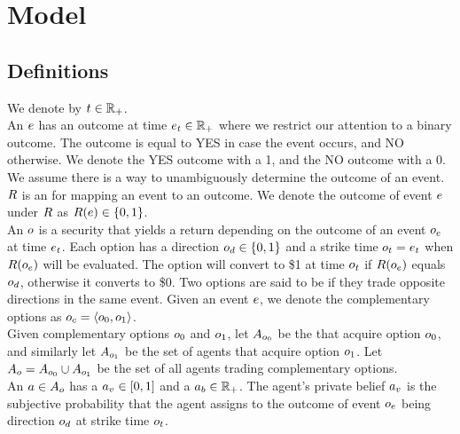 \section{Model}

\subsection{Definitions}

We denote  by $t\in\mathbb{R}_+$. \\

An  $e$ has an outcome at time $e_t \in \mathbb{R}_+$ 
where we restrict our attention to a binary outcome. 
The outcome is equal to YES in case the event occurs, and NO otherwise. 
We denote the YES outcome with a 1, and the NO outcome with a 0.
We assume there is a way to unambiguously determine the outcome of an event. \\

$R$ is an  for mapping an event to an outcome.
We denote the outcome of event $e$ under $R$ as 
$R(e) \in \{0,1\}$.\\

An  $o$ is a security that yields a return depending on 
the outcome of an event $o_e$ at time $e_t$. Each option has a direction 
$o_d \in \{0, 1\}$ and a strike time $o_t = e_t$ 
when $R(o_e)$ will be evaluated. 
The option will convert to \$1 at time $o_t$ if $R(o_e)$ equals 
$o_d$, otherwise it converts to \$0. Two options are said to be
 if they trade opposite directions in the same event. Given an
event $e$, we denote the complementary options as 
$o_c = \left<o_{0}, o_{1}\right>$.\\

Given complementary options $o_{0}$ and $o_{1}$,
let $A_{o_0}$ be the  that acquire option
$o_{0}$, and similarly let $A_{o_1}$ be the set 
of agents that acquire option $o_{1}$. 
Let $A_o = A_{o_0} \cup A_{o_1}$
be the set of all agents trading complementary options.\\

An  $a\in A_o$ has a  
$a_v \in [0,1]$ 
and a  $a_b \in \mathbb{R}_+$.
The agent's private belief $a_v$ 
is the subjective probability that the agent
assigns to the outcome of event $o_e$ being direction $o_d$
at strike time $o_t$.\\

